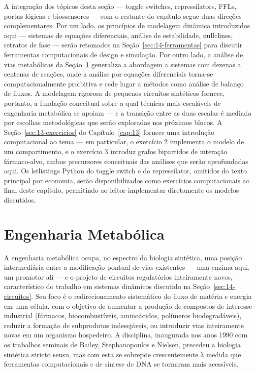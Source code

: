 A integração dos tópicos desta seção --- toggle switches, repressilators, FFLs, portas lógicas e biossensores --- com o restante do capítulo segue duas direções complementares. Por um lado, os princípios de modelagem dinâmica introduzidos aqui --- sistemas de equações diferenciais, análise de estabilidade, nullclines, retratos de fase --- serão retomados na Seção~\ref{sec:14-ferramentas} para discutir ferramentas computacionais de design e simulação. Por outro lado, a análise de vias metabólicas da Seção~\ref{sec:14-metabolica} generaliza a abordagem a sistemas com dezenas a centenas de reações, onde a análise por equações diferenciais torna-se computacionalmente proibitiva e cede lugar a métodos como análise de balanço de fluxos. A modelagem rigorosa de pequenos circuitos sintéticos fornece, portanto, a fundação conceitual sobre a qual técnicas mais escaláveis de engenharia metabólica se apoiam --- e a transição entre as duas escalas é mediada por escolhas metodológicas que serão exploradas nos próximos blocos. A Seção~\ref{sec:13-exercicios} do Capítulo~\ref{cap:13} fornece uma introdução computacional ao tema --- em particular, o exercício 2 implementa o modelo de um compartimento, e o exercício 3 introduz grafos bipartidos de interação fármaco-alvo, ambos precursores conceituais das análises que serão aprofundadas aqui. Os lstlistings Python do toggle switch e do repressilator, omitidos do texto principal por economia, serão disponibilizados como exercícios computacionais ao final deste capítulo, permitindo ao leitor implementar diretamente os modelos discutidos.



\section{Engenharia Metabólica}
\label{sec:14-metabolica}

A engenharia metabólica ocupa, no espectro da biologia sintética, uma posição intermediária entre a modificação pontual de vias existentes --- uma enzima aqui, um promotor ali --- e o projeto de circuitos regulatórios inteiramente novos, característico do trabalho em sistemas dinâmicos discutido na Seção~\ref{sec:14-circuitos}. Seu foco é o redirecionamento sistemático do fluxo de matéria e energia em uma célula, com o objetivo de aumentar a produção de compostos de interesse industrial (fármacos, biocombustíveis, aminoácidos, polímeros biodegradáveis), reduzir a formação de subprodutos indesejáveis, ou introduzir vias inteiramente novas em um organismo hospedeiro. A disciplina, inaugurada nos anos 1990 com os trabalhos seminais de Bailey, Stephanopoulos e Nielsen, precedeu a biologia sintética stricto sensu, mas com esta se sobrepõe crescentemente à medida que ferramentas computacionais e de síntese de DNA se tornaram mais acessíveis.


